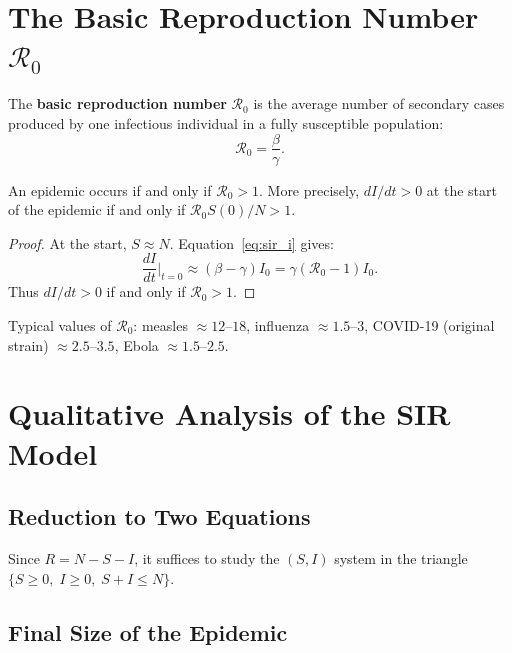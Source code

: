 \section{The Basic Reproduction Number $\mathcal{R}_0$}
\label{sec:r0}

\begin{definition}
The \textbf{basic reproduction number} $\mathcal{R}_0$ is the average
number of secondary cases produced by one infectious individual in a
fully susceptible population:
\[
  \mathcal{R}_0 = \frac{\beta}{\gamma}.
\]
\end{definition}

\begin{theorem}
An epidemic occurs if and only if $\mathcal{R}_0 > 1$.  More
precisely, $dI/dt > 0$ at the start of the epidemic if and only if
$\mathcal{R}_0 S(0)/N > 1$.
\end{theorem}

\begin{proof}
At the start, $S\approx N$.  Equation~\eqref{eq:sir_i} gives:
\[
  \frac{dI}{dt}\bigg|_{t=0} \approx (\beta-\gamma)I_0
  = \gamma(\mathcal{R}_0-1)I_0.
\]
Thus $dI/dt > 0$ if and only if $\mathcal{R}_0 > 1$.
\end{proof}

\begin{remark}
Typical values of $\mathcal{R}_0$: measles $\approx 12$--$18$,
influenza $\approx 1.5$--$3$, COVID-19 (original strain)
$\approx 2.5$--$3.5$, Ebola $\approx 1.5$--$2.5$.
\end{remark}

\section{Qualitative Analysis of the SIR Model}

\subsection{Reduction to Two Equations}

Since $R=N-S-I$, it suffices to study the $(S,I)$ system in the
triangle $\{S\geq 0,\;I\geq 0,\;S+I\leq N\}$.

\subsection{Final Size of the Epidemic}

